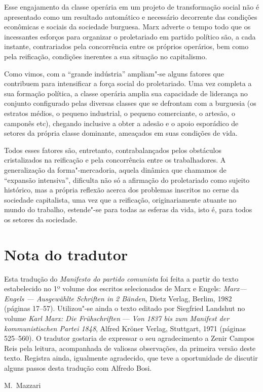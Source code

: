 Esse engajamento da classe operária em um projeto de transformação
social não é apresentado como um resultado automático e necessário
decorrente das condições econômicas e sociais da sociedade burguesa.
Marx adverte o tempo todo que os incessantes esforços para organizar o
proletariado em partido político são, a cada instante, contrariados
pela concorrência entre os próprios operários, bem como pela reificação,
condições inerentes a sua situação no capitalismo.

Como vimos, com a “grande indústria” ampliam"-se alguns fatores que
contribuem para intensificar a força social do proletariado. Uma vez
completa a sua formação política, a classe operária amplia sua
capacidade de liderança no conjunto configurado pelas diversas classes
que se defrontam com a burguesia (os estratos médios, o pequeno
industrial, o pequeno comerciante, o artesão, o camponês etc), chegando
inclusive a obter a adesão e o apoio esporádico de setores da própria
classe dominante, ameaçados em suas condições de vida. 

Todos esses fatores são, entretanto, contrabalançados pelos obstáculos
cristalizados na reificação e pela concorrência entre os trabalhadores.
A generalização da forma"-mercadoria, aquela dinâmica que chamamos de
“expansão intensiva”, dificulta não só a afirmação do proletariado como
sujeito histórico, mas a própria reflexão acerca dos problemas
inscritos no cerne da sociedade capitalista, uma vez que a reificação,
originariamente atuante no mundo do trabalho, estende"-se para todas
as esferas da vida, isto é, para todos os setores da sociedade.

\oneside
\setcounter{tocdepth}{0}
\setcounter{secnumdepth}{-2}
\theendnotes
\twoside

\chapter{Nota do tradutor}

Esta tradução do \textit{Manifesto do partido comunista} foi feita a
partir do texto estabelecido no 1º volume dos escritos selecionados de
Marx e Engels: \textit{Marx---Engels --- Ausgewählte Schriften in 2
Bänden}, Dietz Verlag, Berlim, 1982 (páginas 17--57). Utilizou"-se
ainda o texto editado por Siegfried Landshut no volume \textit{Karl
Marx: Die  Frühschriften} --- \textit{Von 1837 bis zum Manifest der
kommunistischen Partei 1848}, Alfred Kröner Verlag, Stuttgart, 1971
(páginas 525--560). O tradutor gostaria de expressar o seu
agradecimento a Zenir Campos Reis pela leitura, acompanhada de valiosas
observações, da primeira versão deste texto. Registra ainda, igualmente
agradecido, que teve a oportunidade de discutir alguns passos desta
tradução com Alfredo Bosi.\bigskip

\hfill M.~Mazzari\ \ \  

